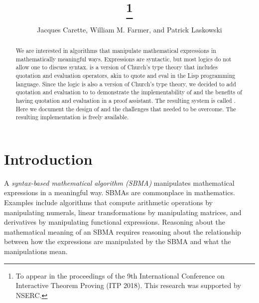 \documentclass[fleqn]{llncs}
\title{{\HLQE}\thanks{To appear in the proceedings of the 9th
    International Conference on Interactive Theorem Proving (ITP
    2018).  This research was supported by NSERC.}}
\author{Jacques Carette, William M. Farmer, and Patrick Laskowski}
\institute{%
Computing and Software, McMaster University, Canada\\
\url{http://www.cas.mcmaster.ca/~carette}\\
\url{http://imps.mcmaster.ca/wmfarmer}\\[1.5ex]
19 June 2018
}
\begin{document}
\maketitle

\begin{abstract}
We are interested in algorithms that manipulate mathematical
expressions in mathematically meaningful ways. Expressions are
syntactic, but most logics do not allow one to discuss syntax.
{\churchqe} is a version of Church's type theory that includes
quotation and evaluation operators, akin to quote and eval
in the Lisp programming language.  Since the {\HOL} logic is also a
version of Church's type theory, we decided to add quotation and
evaluation to {\HL} to demonstrate the implementability of {\churchqe}
and the benefits of having quotation and evaluation in a proof
assistant.  The resulting system is called {\HLQE}.  Here we document
the design of {\HLQE} and the challenges that needed to be overcome.
The resulting implementation is freely available.
\end{abstract}

\iffalse 

\textbf{Keywords:} Church's type theory, quotation and evaluation, HOL
Light, proof assistants, symbolic computation, reasoning about syntax,
metareasoning, reflection, biform theories.

\fi

\section{Introduction}\label{sec:introduction}

A \emph{syntax-based mathematical algorithm (SBMA)} manipulates
mathematical expressions in a meaningful way.  SBMAs
are commonplace in mathematics.  Examples include algorithms that
compute arithmetic operations by manipulating numerals, linear
transformations by manipulating matrices, and derivatives by
manipulating functional expressions.  Reasoning about the mathematical
meaning of an SBMA requires reasoning about the relationship between
how the expressions are manipulated by the SBMA and what the
manipulations mean.
\end{document}
